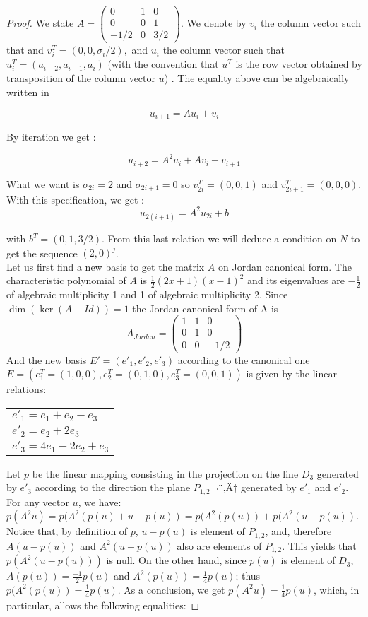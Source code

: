 \documentclass[11pt,a4paper]{llncs}
\begin{document}
\begin{proof}
We state  $A=\begin{pmatrix} 0 & 1 & 0\\ 0 & 0 & 1\\ -1/2 & 0 & 3/2 \end{pmatrix}$. We denote  by $v_i$ the column vector such that  and $v_i^T = ( 0,   0,  \sigma_i/2 ),$
and    $u_i$ the column vector such that $u_i^T =(a_{i-2},a_{i-1},a_i)$ (with the convention that  $u^T$ is  the row vector   obtained by transposition of the column vector $u$) . The equality above can be algebraically written in

 $$u_{i+1}=A u_i + v_i$$

By
iteration we get :

$$u_{i+2}=A^2u_i+A v_i + v_{i+1}$$

What we want is $\sigma_{2i}=2$ and $\sigma_{2i+1}=0$ so $v_{2i}^T=(0,0,1)$ and $v_{2i+1}^T=(0,0,0)$. With this specification, we get : 
$$ u_{2(i+1)}=A^2u_{2i}  + b $$


 with $b^T =  (0,1,3/2)$.
From this last relation we will deduce a condition on $N$ to get the sequence $(2,0)^j$.\\


Let us first find a new basis to get the matrix $A$ on Jordan canonical form. The characteristic polynomial of $A$ is $\frac{1}{2}(2x+1)(x-1)^2$ and its eigenvalues are $-\frac{1}{2}$ of algebraic multiplicity 1 and 1 of algebraic multiplicity 2. Since $\dim ( \ker (A-Id))=1$ the Jordan canonical form of A is
\[
 A_{Jordan} =\begin{pmatrix} 1 & 1 & 0\\ 0 & 1 & 0\\ 0 & 0 & -1/2 \end{pmatrix}
\]
And the new basis $E'=(e'_1,e'_2,e'_3)$ according to the canonical one $E=(e_1^T=(1,0,0), e_2^T=(0,1,0), e_3^T=(0,0,1))$ is given by the linear relations:
\begin{center}
 \begin{tabular}{l}
   $e'_1=e_1+e_2+e_3$\\
   $e'_2=e_2+2e_3$\\
   $e'_3=4e_1-2e_2+e_3$
 \end{tabular}
\end{center}

Let $p$ be  the
 linear mapping consisting in the projection on the line $D_3$ generated  by  $e'_3$ according to the direction the plane $P_{1, 2}$¬¨‚Ä† generated by $e'_1$ and $e'_2$. For any vector $u$, we have:  $p(A^2u) = p(A^2(p(u) + u -p(u))  = p(A^2(p(u)) +  p(A^2 (u -p(u))$. Notice that, by definition of $p$, $u -p(u) $ is element of $P_{1, 2}$, and,  therefore $A(u -p(u))$ and $A^2(u -p(u))$ also are elements of $P_{1, 2}$. This yields that $p(A^2 (u -p(u)))$ is null.
 On the other hand, since  $p(u) $ is element of $D_{3 }$, $A(p(u))  = \frac{-1}{2 }p(u)$ and $A^2(p(u))  = \frac{1}{4 }p(u)$;  thus  $p(A^2(p(u)) =  \frac{1}{4}p(u)$. As a conclusion, we get $p(A^2u) = \frac{1}{4}p(u)$, which, in particular, allows the following equalities:


\end{proof}
\end{document}
